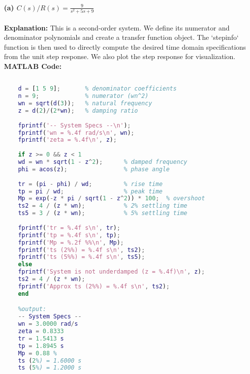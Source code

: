 \documentclass[a4paper,12pt]{article}
\begin{document}
	\paragraph{(a) $C(s)/R(s) = \frac{9}{s^2+5s+9}$}
	\textbf{Explanation:}
	This is a second-order system. We define its numerator and denominator polynomials and create a transfer function object. The `stepinfo` function is then used to directly compute the desired time domain specifications from the unit step response. We also plot the step response for visualization.
	\newpage
	\textbf{MATLAB Code:}
	\begin{lstlisting}[language=Matlab, caption=MATLAB Code for Problem 1(a)]
	% G(s) = 9 / (s^2 + 5s + 9)
	
	d = [1 5 9];       % denominator coefficients
	n = 9;             % numerator (wn^2)
	wn = sqrt(d(3));   % natural frequency
	z = d(2)/(2*wn);   % damping ratio
	
	fprintf('-- System Specs --\n');
	fprintf('wn = %.4f rad/s\n', wn);
	fprintf('zeta = %.4f\n', z);
	
	if z >= 0 && z < 1
	wd = wn * sqrt(1 - z^2);      % damped frequency
	phi = acos(z);                % phase angle
	
	tr = (pi - phi) / wd;         % rise time
	tp = pi / wd;                 % peak time
	Mp = exp(-z * pi / sqrt(1 - z^2)) * 100;  % overshoot
	ts2 = 4 / (z * wn);           % 2% settling time
	ts5 = 3 / (z * wn);           % 5% settling time
	
	fprintf('tr = %.4f s\n', tr);
	fprintf('tp = %.4f s\n', tp);
	fprintf('Mp = %.2f %%\n', Mp);
	fprintf('ts (2%%) = %.4f s\n', ts2);
	fprintf('ts (5%%) = %.4f s\n', ts5);
	else
	fprintf('System is not underdamped (z = %.4f)\n', z);
	ts2 = 4 / (z * wn);
	fprintf('Approx ts (2%%) = %.4f s\n', ts2);
	end

	%output:
	-- System Specs --
	wn = 3.0000 rad/s
	zeta = 0.8333
	tr = 1.5413 s
	tp = 1.8945 s
	Mp = 0.88 %
	ts (2%) = 1.6000 s
	ts (5%) = 1.2000 s
	\end{lstlisting}
	
\end{document}
